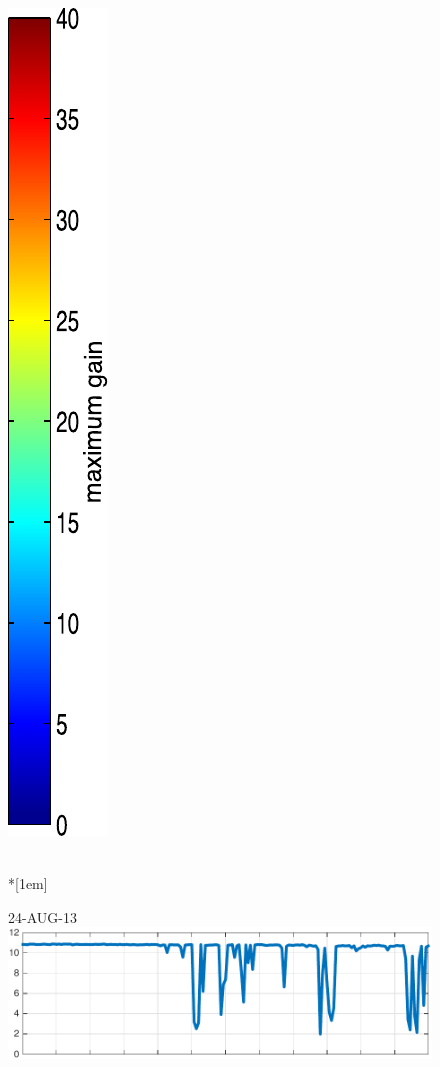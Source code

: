 \begin{figure}
\begin{minipage}[c]{\mylength}
\includegraphics[valign=t,trim=2pt -8pt 0 5pt,width=\colorbarwidth,totalheight=\eventheight]{events/colorbar-40.pdf}
\end{minipage}  \\*[1em]
\begin{minipage}[c]{\mylength}
\centering \scriptsize 24-AUG-13 \\
\includegraphics[valign=t,trim=0 0 5pt 0,angle=90,origin=tr,width=\sunintwidth,totalheight=\eventheight]{events/20130824-intensity.pdf}

\end{minipage}
\end{figure}
